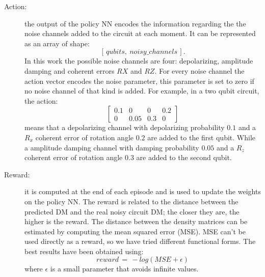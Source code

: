 \documentclass[referee,sn-basic]{sn-jnl} %
\begin{document}
\begin{description}
    \item[Action:] the output of the policy NN encodes the information regarding the the noise channels added to the circuit at each moment. It can be represented as an array of shape:
    $$[\,qubits, \: noisy\_channels\,].$$
    In this work the possible noise channels are four: depolarizing, amplitude damping and coherent errors $RX$ and $RZ$. For every noise channel the action vector encodes the noise parameter, this parameter is set to zero if no noise channel of that kind is added. For example, in a two qubit circuit, the action:
    \begin{equation*}
    \left[\begin{array}{cccc}
    0.1 & 0 & 0 & 0.2 \\
    0 & 0.05 & 0.3 & 0
    \end{array} \right]
    \end{equation*}
    means that a depolarizing channel with depolarizing probability $0.1$ and a $R_x$ coherent error of rotation angle $0.2$ are added to the first qubit. While a amplitude damping channel with damping probability $0.05$ and a $R_z$ coherent error of rotation angle $0.3$ are added to the second qubit.

    \item[Reward:] it is computed at the end of each episode and is used to update the weights on the policy NN. The reward is related to the distance between the predicted DM and the real noisy circuit DM; the closer they are, the higher is the reward. The distance between the density matrices can be estimated by computing the mean squared error (MSE). MSE can't be used directly as a reward, so we have tried different functional forms. The best results have been obtained using:
    $$reward \,= \,-log(MSE+\epsilon)$$
    where $\epsilon$ is a small parameter that avoids infinite values.
\end{description}


\end{document}

